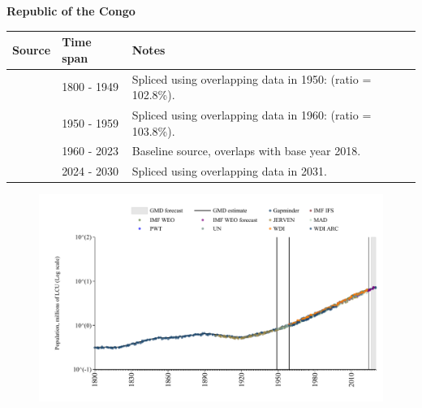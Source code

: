 \documentclass[12pt,a4paper,landscape]{article}
\begin{document}
\begin{adjustbox}{max totalsize={\paperwidth}{\paperheight},center}
\begin{minipage}[t][\textheight][t]{\textwidth}
\vspace*{0.5cm}
{}
\begin{center}
{\Large\bfseries Republic of the Congo}
\end{center}
\vspace{0.5cm}
\begin{table}[H]
\centering
\small
\begin{tabular}{|l|l|l|}
\hline
\textbf{Source} & \textbf{Time span} & \textbf{Notes} \\
\hline
\rowcolor{white}\cite{Gapminder}& 1800 - 1949 &Spliced using overlapping data in 1950: (ratio = 102.8\%).\\
\rowcolor{lightgray}\cite{IMF_IFS}& 1950 - 1959 &Spliced using overlapping data in 1960: (ratio = 103.8\%).\\
\rowcolor{white}\cite{WDI}& 1960 - 2023 &Baseline source, overlaps with base year 2018.\\
\rowcolor{lightgray}\cite{Gapminder}& 2024 - 2030 &Spliced using overlapping data in 2031.\\
\hline
\end{tabular}
\end{table}
\begin{figure}[H]
\centering
\includegraphics[width=\textwidth,height=0.6\textheight,keepaspectratio]{graphs/COG_pop.pdf}
\end{figure}
\end{minipage}
\end{adjustbox}
\end{document}

